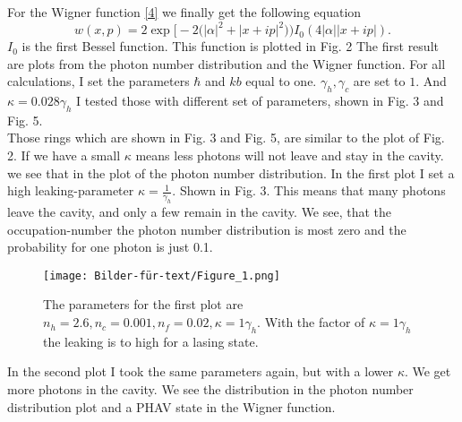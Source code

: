 \documentclass[12pt,a4paper]{article}
\begin{document}
For the Wigner function \eqref{4} we finally get the following equation
\begin{equation}
w(x,p)=2  \exp\bigl[-2\bigl(|\alpha|^2+|x+ip|^2\bigr)\bigr) I_0 (4|\alpha| |x+ip|).
\end{equation}
$I_0$ is the first  Bessel function.
This function is plotted in Fig. 2
The first result are plots from the photon number distribution and the Wigner function.
For all calculations, I set the parameters  $\hbar$ and $kb$ equal to one. $\gamma_h, \gamma_c $ are set to $ 1$. And $\kappa=0.028\gamma_h$
I tested those with different set of parameters,
shown in Fig. 3 and Fig. 5.\\
Those rings which are shown in Fig. 3 and Fig. 5, are similar to the plot of Fig. 2.
If we have a small $\kappa$ means less photons will not leave and stay in the cavity. we see that in the plot of the photon number distribution.
In the first plot I set a high leaking-parameter $\kappa=\frac{1}{\gamma_h}$. Shown in Fig. 3.
This means that many photons leave the cavity, and only a few remain in the cavity. 
We see, that the occupation-number the photon number distribution is most zero and the probability for one photon is just 0.1.

\begin{figure}[hbtp]
\centering
\texttt{[image: Bilder-für-text/Figure\_1.png]}
\caption{The parameters for the first plot are $n_h=2.6, n_c=0.001, n_f=0.02, \kappa=1\gamma_h $. With  the factor of $\kappa=1\gamma_h$ the leaking is to high for a lasing state.}
\end{figure}\newpage

In the second plot I took the same parameters again, but with a lower $\kappa$. We get more photons in the cavity. We see the distribution in the photon number distribution plot and a PHAV state in the Wigner function. 

\newpage
\end{document}
